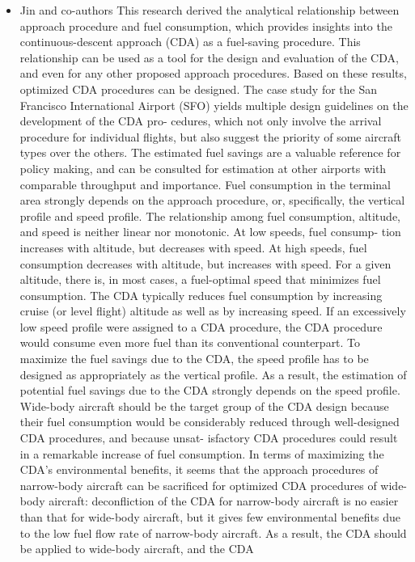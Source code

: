 \documentclass{aer1315-pretty}
\begin{document}
\begin{itemize}
\item Jin and co-authors \cite{Jin:2013} 
   This research derived the analytical relationship between approach
procedure and fuel consumption, which provides insights into the
continuous-descent approach (CDA) as a fuel-saving procedure. This
relationship can be used as a tool for the design and evaluation of the
CDA, and even for any other proposed approach procedures. Based
on these results, optimized CDA procedures can be designed. The
case study for the San Francisco International Airport (SFO) yields
multiple design guidelines on the development of the CDA pro-
cedures, which not only involve the arrival procedure for individual
flights, but also suggest the priority of some aircraft types over the
others. The estimated fuel savings are a valuable reference for policy
making, and can be consulted for estimation at other airports with
comparable throughput and importance.
   Fuel consumption in the terminal area strongly depends on the
approach procedure, or, specifically, the vertical profile and speed
profile. The relationship among fuel consumption, altitude, and
speed is neither linear nor monotonic. At low speeds, fuel consump-
tion increases with altitude, but decreases with speed. At high speeds,
fuel consumption decreases with altitude, but increases with speed.
For a given altitude, there is, in most cases, a fuel-optimal speed
that minimizes fuel consumption. The CDA typically reduces fuel
consumption by increasing cruise (or level flight) altitude as well
as by increasing speed. If an excessively low speed profile were
assigned to a CDA procedure, the CDA procedure would consume
even more fuel than its conventional counterpart. To maximize the
fuel savings due to the CDA, the speed profile has to be designed as
appropriately as the vertical profile. As a result, the estimation of
potential fuel savings due to the CDA strongly depends on the speed
profile. Wide-body aircraft should be the target group of the CDA
design because their fuel consumption would be considerably
reduced through well-designed CDA procedures, and because unsat-
isfactory CDA procedures could result in a remarkable increase of
fuel consumption. In terms of maximizing the CDA’s environmental
benefits, it seems that the approach procedures of narrow-body
aircraft can be sacrificed for optimized CDA procedures of wide-
body aircraft: deconfliction of the CDA for narrow-body aircraft is no
easier than that for wide-body aircraft, but it gives few environmental
benefits due to the low fuel flow rate of narrow-body aircraft. As a
result, the CDA should be applied to wide-body aircraft, and the CDA

\end{itemize}
\end{document}
